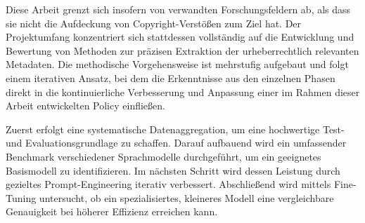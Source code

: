 Diese Arbeit grenzt sich insofern von verwandten Forschungsfeldern ab, als dass sie nicht die Aufdeckung von Copyright-Verstößen zum Ziel hat.
Der Projektumfang konzentriert sich stattdessen vollständig auf die Entwicklung und Bewertung von Methoden zur präzisen Extraktion der urheberrechtlich relevanten Metadaten.
Die methodische Vorgehensweise ist mehrstufig aufgebaut und folgt einem iterativen Ansatz, bei dem die Erkenntnisse aus den einzelnen Phasen direkt in die kontinuierliche Verbesserung und Anpassung einer im Rahmen dieser Arbeit entwickelten Policy einfließen.

Zuerst erfolgt eine systematische Datenaggregation, um eine hochwertige Test- und Evaluationsgrundlage zu schaffen.
Darauf aufbauend wird ein umfassender Benchmark verschiedener Sprachmodelle durchgeführt, um ein geeignetes Basismodell zu identifizieren.
Im nächsten Schritt wird dessen Leistung durch gezieltes Prompt-Engineering iterativ verbessert.
Abschließend wird mittels Fine-Tuning untersucht, ob ein spezialisiertes, kleineres Modell eine vergleichbare Genauigkeit bei höherer Effizienz erreichen kann.